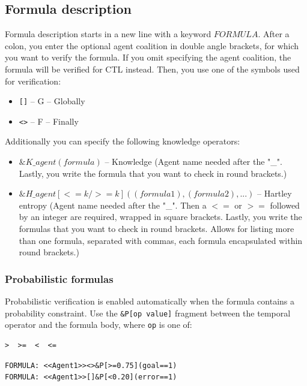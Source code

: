 \documentclass[12pt]{article}
\begin{document}
\subsection{Formula description}
Formula description starts in a new line with a keyword $FORMULA$. After a colon, you enter the optional agent coalition in double angle brackets, for which you want to verify the formula. If you omit specifying the agent coalition, the formula will be verified for CTL instead. Then, you use one of the symbols used for verification:
\begin{itemize}
  \item \verb+[]+ -- G -- Globally
  \item \verb+<>+ -- F -- Finally
\end{itemize}
Additionally you can specify the following knowledge operators:
\begin{itemize}
  \item $\&K{\_}agent(formula)$ -- Knowledge (Agent name needed after the "{\_}". Lastly, you write the formula that you want to check in round brackets.)
  \item $\&H{\_}agent[<=k/>=k]((formula1), (formula2), ...)$ -- Hartley entropy (Agent name needed after the "{\_}". Then a $<=$ or $>=$ followed by an integer are required, wrapped in square brackets. Lastly, you write the formulas that you want to check in round brackets. Allows for listing more than one formula, separated with commas, each formula encapsulated within round brackets.)
\end{itemize}

\subsubsection{Probabilistic formulas}
Probabilistic verification is enabled automatically when the formula contains a probability constraint. Use the \verb|&P[op value]| fragment between the temporal operator and the formula body, where \verb|op| is one of:
\begin{lstlisting}
>  >=  <  <=
\end{lstlisting}

\begin{lstlisting}[title={Examples of probabilistic formulas.}]
FORMULA: <<Agent1>><>&P[>=0.75](goal==1)
FORMULA: <<Agent1>>[]&P[<0.20](error==1)
\end{lstlisting}
\end{document}
